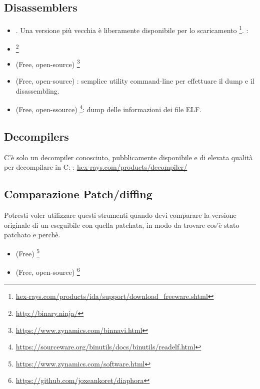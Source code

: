 \subsection{Disassemblers}


\begin{itemize}
\item {}. Una versione più vecchia è liberamente disponibile per lo scaricamento
\footnote{\href{http://go.yurichev.com/17031}{hex-rays.com/products/ida/support/download\_freeware.shtml}}.
\ShortHotKeyCheatsheet: 

\item {}\footnote{\url{http://binary.ninja/}}

\item (Free, open-source) \footnote{\url{https://www.zynamics.com/binnavi.html}}

\item (Free, open-source) : semplice utility command-line per effettuare il dump e il disassembling.

\item (Free, open-ssource) \footnote{\url{https://sourceware.org/binutils/docs/binutils/readelf.html}}:
dump delle informazioni dei file ELF.
\end{itemize}

\subsection{Decompilers}

C'è solo un decompiler conosciuto, pubblicamente disponibile e di elevata qualità per decompilare in C: :
\href{http://go.yurichev.com/17033}{hex-rays.com/products/decompiler/}

\subsection{Comparazione Patch/diffing}

Potresti voler utilizzare questi strumenti quando devi comparare la versione originale di un eseguibile con quella patchata,
in modo da trovare cos'è stato patchato e perchè.

\begin{itemize}
\item (Free) \footnote{\url{https://www.zynamics.com/software.html}}

\item (Free, open-source) \footnote{\url{https://github.com/joxeankoret/diaphora}}
\end{itemize}

